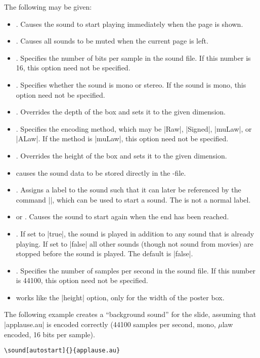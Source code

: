\begin{command}{\sound{}}
  The following  may be given:
  \begin{itemize}
  \item
    . Causes the sound to start playing immediately when the page is shown.
  \item
    . Causes all sounds to be muted when the current page is left.
  \item
    . Specifies the number of bits per sample in the sound file. If this number is 16, this option need not be specified.
  \item
    . Specifies whether the sound is mono or stereo. If the sound is mono, this option need not be specified.
  \item
    . Overrides the depth of the  box and sets it to the given dimension.
  \item
    . Specifies the encoding method, which may be |Raw|, |Signed|, |muLaw|, or |ALaw|. If the method is |muLaw|, this option need not be specified.
  \item
    . Overrides the height of the  box and sets it to the given dimension.
  \item
     causes the sound data to be stored directly in the \pdf-file.
  \item
    . Assigns a label to the sound such that it can later be referenced by the command |\hyperlinksound|, which can be used to start a sound. The  is not a normal label.
  \item
     or . Causes the sound to start again when the end has been reached.
  \item
    . If set to |true|, the sound is played in addition to any sound that is already playing. If set to |false| all other sounds (though not sound from movies) are stopped before the sound is played. The default is |false|.
  \item
    . Specifies the number of samples per second in the sound file. If this number is 44100, this option need not be specified.
  \item
     works like the |height| option, only for the width of the poster box.
  \end{itemize}

  \example
  The following example creates a ``background sound'' for the slide, assuming that |applause.au| is encoded correctly (44100 samples per second, mono, $\mu$law encoded, 16 bits per sample).

\begin{verbatim}
\sound[autostart]{}{applause.au}
\end{verbatim}
\end{command}

